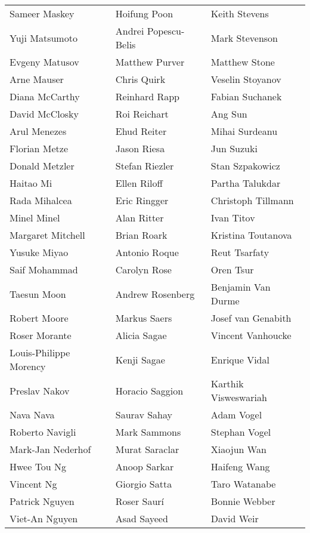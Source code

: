 \begin{tabular*}{\textwidth}{@{\extracolsep{\fill}} lll }
  Sameer Maskey  & Hoifung Poon  & Keith Stevens \\
  Yuji Matsumoto  & Andrei Popescu-Belis  & Mark Stevenson \\
  Evgeny Matusov  & Matthew Purver  & Matthew Stone \\
  Arne Mauser  & Chris Quirk  & Veselin Stoyanov \\
  Diana McCarthy  & Reinhard Rapp  & Fabian Suchanek \\
  David McClosky  & Roi Reichart  & Ang Sun \\
  Arul Menezes  & Ehud Reiter  & Mihai Surdeanu \\
  Florian Metze  & Jason Riesa  & Jun Suzuki \\
  Donald Metzler  & Stefan Riezler  & Stan Szpakowicz \\
  Haitao Mi  & Ellen Riloff  & Partha Talukdar \\
  Rada Mihalcea  & Eric Ringger  & Christoph Tillmann \\
  Minel Minel  & Alan Ritter  & Ivan Titov \\
  Margaret Mitchell  & Brian Roark  & Kristina Toutanova \\
  Yusuke Miyao  & Antonio Roque  & Reut Tsarfaty \\
  Saif Mohammad  & Carolyn Rose  & Oren Tsur \\
  Taesun Moon  & Andrew Rosenberg  & Benjamin Van Durme \\
  Robert Moore  & Markus Saers  & Josef van Genabith \\
  Roser Morante  & Alicia Sagae  & Vincent Vanhoucke \\
  Louis-Philippe Morency  & Kenji Sagae  & Enrique Vidal \\
  Preslav Nakov  & Horacio Saggion  & Karthik Visweswariah \\
  Nava Nava  & Saurav Sahay  & Adam Vogel \\
  Roberto Navigli  & Mark Sammons  & Stephan Vogel \\
  Mark-Jan Nederhof  & Murat Saraclar  & Xiaojun Wan \\
  Hwee Tou Ng  & Anoop Sarkar  & Haifeng Wang \\
  Vincent Ng  & Giorgio Satta  & Taro Watanabe \\
  Patrick Nguyen  & Roser Saurí  & Bonnie Webber \\
  Viet-An Nguyen  & Asad Sayeed  & David Weir \\

\end{tabular*}
